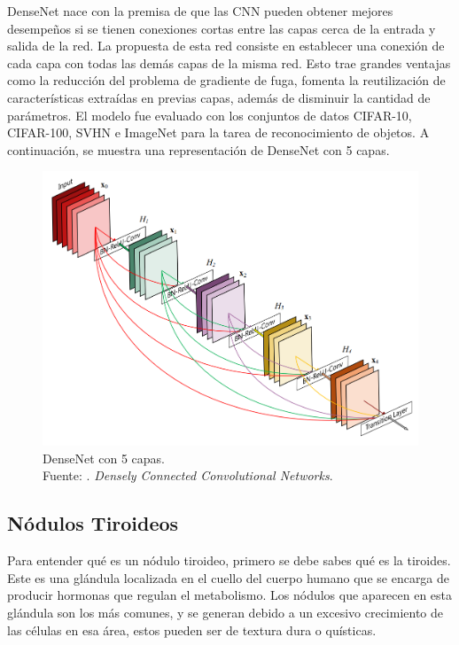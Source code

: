 DenseNet nace con la premisa de que las CNN pueden obtener mejores desempeños si se tienen conexiones cortas entre las capas cerca de la entrada y salida de la red. La propuesta de esta red consiste en establecer una conexión de cada capa con todas las demás capas de la misma red. Esto trae grandes ventajas como la reducción del problema de gradiente de fuga, fomenta la reutilización de características extraídas en previas capas, además de disminuir la cantidad de parámetros. El modelo fue evaluado con los conjuntos de datos CIFAR-10, CIFAR-100, SVHN e ImageNet para la tarea de reconocimiento de objetos. \parencite{pr_huang2016densconn} A continuación, se muestra una representación de DenseNet con 5 capas.

\begin{figure}[H]
	\begin{center}
		\includegraphics[width=1.00\textwidth]{2/figures/densenet_5lay.png}
		\caption[DenseNet con 5 capas]{DenseNet con 5 capas. \\
		Fuente: \cite{pr_huang2016densconn}. \textit{Densely Connected Convolutional Networks}.}
		\label{2:fig205}
	\end{center}
\end{figure}

\subsection{Nódulos Tiroideos}
Para entender qué es un nódulo tiroideo, primero se debe sabes qué es la tiroides. Este es una glándula localizada en el cuello del cuerpo humano que se encarga de producir hormonas que regulan el metabolismo. Los nódulos que aparecen en esta glándula son los más comunes, y se generan debido a un excesivo crecimiento de las células en esa área, estos pueden ser de textura dura o quísticas. \parencite{pr_deng2022autclass}

